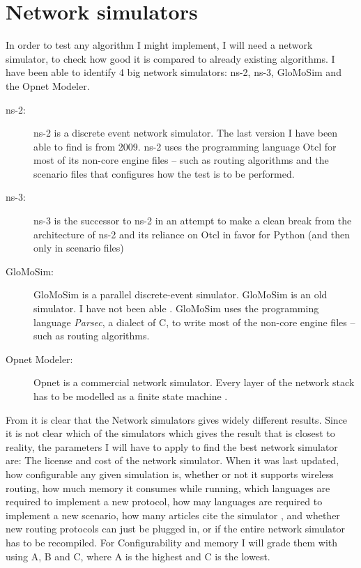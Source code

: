 \section{Network simulators}

In order to test any algorithm I might implement, I will need a network simulator, to check how good it is compared to already existing algorithms. I have been able to identify 4 big network simulators: ns-2, ns-3, GloMoSim and the Opnet Modeler.

\begin{description}
\item[ns-2:] ns-2 is a discrete event network simulator. The last version I have been able to find is from 2009. ns-2 uses the programming language Otcl for most of its non-core engine files -- such as routing algorithms and the scenario files that configures how the test is to be performed.
\item[ns-3:] ns-3 is the successor to ns-2 in an attempt to make a clean break from the architecture of ns-2 and its reliance on Otcl in favor for Python (and then only in scenario files) 
\item[GloMoSim:] GloMoSim is a parallel discrete-event simulator. GloMoSim is an old simulator. I have not been able   . GloMoSim uses the programming language \emph{Parsec}, a dialect of C, to write most of the non-core engine files -- such as routing algorithms. 
\item[Opnet Modeler:] Opnet is a commercial network simulator. Every layer of the network stack has to be modelled as a finite state machine \cite{MANcom}. 
\end{description}

From \cite{MANcom} it is clear that the Network simulators gives widely different results. Since it is not clear which of the simulators which gives the result that is closest to reality, the parameters I will have to apply to find the best network simulator are: The license and cost of the network simulator. When it was last updated, how configurable any given simulation is, whether or not it supports wireless routing, how much memory it consumes while running, which languages are required to implement a new protocol, how may languages are required to implement a new scenario, how many articles cite the simulator , and whether new routing protocols can just be plugged in, or if the entire network simulator has to be recompiled. For Configurability and memory I will grade them with using A, B and C, where A is the highest and C is the lowest.

